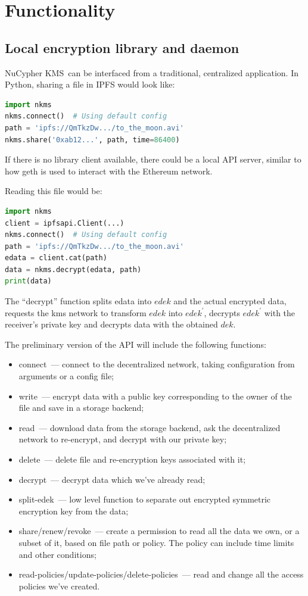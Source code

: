 \documentclass[longbibliography,nofootinbib]{revtex4-1}
\newcommand{\kms}{NuCypher KMS}
\begin{document}
\section{Functionality}

\subsection{Local encryption library and daemon}

\kms~can be interfaced from a traditional, centralized application.
In Python, sharing a file in IPFS would look like:
\begin{lstlisting}[frame=single,language=Python]
import nkms
nkms.connect()  # Using default config
path = 'ipfs://QmTkzDw.../to_the_moon.avi'
nkms.share('0xab12...', path, time=86400)
\end{lstlisting}
If there is no library client available, there could be a local API server, similar to how geth is used to interact with the Ethereum network.

Reading this file would be:
\begin{lstlisting}[frame=single,language=Python]
import nkms
client = ipfsapi.Client(...)
nkms.connect()  # Using default config
path = 'ipfs://QmTkzDw.../to_the_moon.avi'
edata = client.cat(path)
data = nkms.decrypt(edata, path)
print(data)
\end{lstlisting}
The ``decrypt'' function splits edata into $edek$ and the actual encrypted data,
requests the kms network to transform $edek$ into $edek^{\prime}$,
decrypts $edek^{\prime}$ with the receiver's private key and
decrypts data with the obtained $dek$.

The preliminary version of the API will include the following functions:
\begin{itemize}
    \item connect~--- connect to the decentralized network,
        taking configuration from arguments or a config file;
    \item write~--- encrypt data with a public key corresponding to the owner of the file and save in a storage backend;
    \item read~--- download data from the storage backend, ask the decentralized network to re-encrypt, and decrypt with our private key;
    \item delete~--- delete file and re-encryption keys associated with it;
    \item decrypt~--- decrypt data which we've already read;
    \item split-edek~--- low level function to separate out encrypted symmetric encryption key from the data;
    \item share/renew/revoke~--- create a permission to read all the data we own, or a subset of it, based on file path or policy.
        The policy can include time limits and other conditions;
    \item read-policies/update-policies/delete-policies~--- read and change all the access policies we've created.
\end{itemize}
\end{document}
